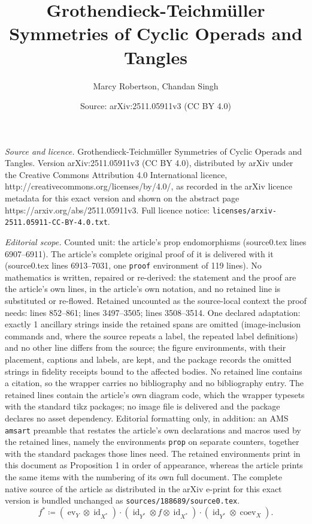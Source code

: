 \documentclass[10pt,a4paper]{amsart}
\title{Grothendieck-Teichm\"uller Symmetries of Cyclic Operads and Tangles}
\author{Marcy Robertson, Chandan Singh}
\date{Source: arXiv:2511.05911v3 (CC BY 4.0)}
\newcommand{\coev}{\operatorname{coev}}
\newcommand{\ev}{\operatorname{ev}}
\newcommand{\id}{\operatorname{id}}
\begin{document}
\maketitle

\noindent\emph{Source and licence.} Grothendieck-Teichm\"uller Symmetries of Cyclic Operads and Tangles. Version arXiv:2511.05911v3 (CC BY 4.0), distributed by arXiv under the Creative Commons Attribution 4.0 International licence, http://creativecommons.org/licenses/by/4.0/, as recorded in the arXiv licence metadata for this exact version and shown on the abstract page https://arxiv.org/abs/2511.05911v3. Full licence notice: \texttt{licenses/arxiv-2511.05911-CC-BY-4.0.txt}.\par\smallskip

\noindent\textit{Editorial scope.} Counted unit: the article's prop endomorphisms (source0.tex lines 6907--6911). The article's complete original proof of it is delivered with it (source0.tex lines 6913--7031, one \texttt{proof} environment of 119 lines). No mathematics is written, repaired or re-derived: the statement and the proof are the article's own lines, in the article's own notation, and no retained line is substituted or re-flowed.  Retained uncounted as the source-local context the proof needs: lines 852--861; lines 3497--3505; lines 3508--3514.  One declared adaptation: exactly 1 ancillary strings inside the retained spans are omitted (image-inclusion commands and, where the source repeats a label, the repeated label definitions) and no other line differs from the source; the figure environments, with their placement, captions and labels, are kept, and the package records the omitted strings in fidelity receipts bound to the affected bodies.  No retained line contains a citation, so the wrapper carries no bibliography and no bibliography entry.  The retained lines contain the article's own diagram code, which the wrapper typesets with the standard tikz packages; no image file is delivered and the package declares no asset dependency.  Editorial formatting only, in addition: an AMS \texttt{amsart} preamble that restates the article's own declarations and macros used by the retained lines, namely the environments \texttt{prop} on separate counters, together with the standard packages those lines need.  The retained environments print in this document as Proposition 1 in order of appearance, whereas the article prints the same items with the numbering of its own full document.  The complete native source of the article as distributed in the arXiv e-print for this exact version is bundled unchanged as \texttt{sources/188689/source0.tex}.
\begin{equation}
\label{eq: transpose of a morphism}
f^*
\coloneqq
(\ev_Y\otimes\id_{X^*})
\cdot
(\id_{Y^*}\otimes f\otimes\id_{X^*})
\cdot
(\id_{Y^*}\otimes\coev_X).
\end{equation}
\end{document}
